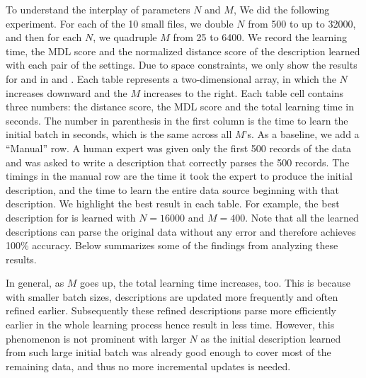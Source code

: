 To understand the interplay of parameters $N$ and $M$,
We did the following experiment. For each of the 10 small files,
we double $N$ from 500 to up to 32000, and then
for each $N$, we quadruple $M$ from 25 to 6400. 
We record the learning time, the MDL score
and the normalized distance score of the description learned with
each pair of the settings. Due to space constraints, we only show
the results for  and  in
 and .
Each table represents a two-dimensional array, in which the $N$
increases downward and the $M$ increases to the right.
Each table cell contains three numbers: the distance score, the MDL score
and the total learning time in seconds. The number in parenthesis in the first column
is the time to learn the initial batch in seconds, which is the same across all
$M$'s. As a baseline, we add a ``Manual'' row. 
A human expert was given
only the first 500 records of the data and was asked to write a \pads{}
description that correctly parses the 500 records. The timings in the manual
row are the time it took the expert to produce the initial description, and the
time to learn the entire data source beginning with that description. 
We highlight the best result in each table. For example, the best description
for  is learned with $N=16000$ and $M=400$. 
Note that all the learned descriptions can parse the original data
without any error and therefore achieves 100\% accuracy. 
Below summarizes some of the findings from analyzing these results.


In general, as $M$ goes up, the total learning time
increases, too. This is because with smaller batch sizes, descriptions are 
updated more frequently and often refined earlier. Subsequently these
refined descriptions parse more efficiently earlier in the whole learning process
hence result in less time. However, this phenomenon is not prominent with larger
$N$ as the initial description learned from such large
initial batch was already good enough to cover most of the remaining data,
and thus no more incremental updates is needed.

